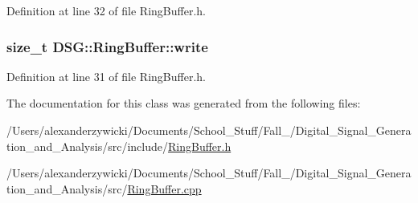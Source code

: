 Definition at line 32 of file Ring\+Buffer.\+h.

\hypertarget{classDSG_1_1RingBuffer_a703434b6afb87f1f9a05750278a822e3}{
\subsubsection[{write}]{\setlength{\rightskip}{0pt plus 5cm}size\+\_\+t D\+S\+G\+::\+Ring\+Buffer\+::write\hspace{0.3cm}{\ttfamily [protected]}}}\label{classDSG_1_1RingBuffer_a703434b6afb87f1f9a05750278a822e3}


Definition at line 31 of file Ring\+Buffer.\+h.



The documentation for this class was generated from the following files\+:\begin{DoxyCompactItemize}
\item 
/\+Users/alexanderzywicki/\+Documents/\+School\+\_\+\+Stuff/\+Fall\+\_/\+Digital\+\_\+\+Signal\+\_\+\+Generation\+\_\+and\+\_\+\+Analysis/src/include/\hyperlink{RingBuffer_8h}{Ring\+Buffer.\+h}\item 
/\+Users/alexanderzywicki/\+Documents/\+School\+\_\+\+Stuff/\+Fall\+\_/\+Digital\+\_\+\+Signal\+\_\+\+Generation\+\_\+and\+\_\+\+Analysis/src/\hyperlink{RingBuffer_8cpp}{Ring\+Buffer.\+cpp}\end{DoxyCompactItemize}
